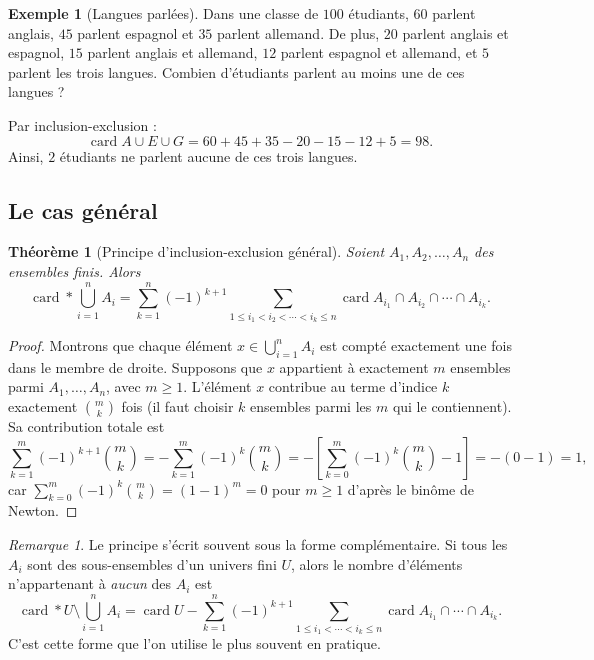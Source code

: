 \documentclass[12pt,a4paper,openany]{book}
\theoremstyle{definition}
\newtheorem{exemple}[definition]{Exemple}
\theoremstyle{plain}
\newtheorem{theoreme}[definition]{Théorème}
\theoremstyle{remark}
\newtheorem{remarque}[definition]{Remarque}
\DeclareMathOperator{\card}{card}
\begin{document}
\begin{exemple}[Langues parlées]
\label{ex:ie-langues}
Dans une classe de $100$ étudiants, $60$ parlent anglais, $45$ parlent espagnol
et $35$ parlent allemand. De plus, $20$ parlent anglais et espagnol, $15$ parlent
anglais et allemand, $12$ parlent espagnol et allemand, et $5$ parlent les trois langues.
Combien d'étudiants parlent au moins une de ces langues ?

Par inclusion-exclusion :
\[
  \card{A \cup E \cup G} = 60 + 45 + 35 - 20 - 15 - 12 + 5 = 98.
\]
Ainsi, $2$ étudiants ne parlent aucune de ces trois langues.
\end{exemple}

\subsection{Le cas général}

\begin{theoreme}[Principe d'inclusion-exclusion général]
\label{thm:ie-general}
Soient $A_1, A_2, \dots, A_n$ des ensembles finis. Alors
\[
  \card*{\bigcup_{i=1}^{n} A_i}
    = \sum_{k=1}^{n} (-1)^{k+1}
      \sum_{1 \leqslant i_1 < i_2 < \cdots < i_k \leqslant n}
      \card{A_{i_1} \cap A_{i_2} \cap \cdots \cap A_{i_k}}.
\]
\end{theoreme}

\begin{proof}
Montrons que chaque élément $x \in \bigcup_{i=1}^n A_i$ est compté exactement
une fois dans le membre de droite. Supposons que $x$ appartient à exactement
$m$ ensembles parmi $A_1, \dots, A_n$, avec $m \geqslant 1$.
L'élément $x$ contribue au terme d'indice $k$ exactement $\binom{m}{k}$ fois
(il faut choisir $k$ ensembles parmi les $m$ qui le contiennent). Sa contribution
totale est
\[
  \sum_{k=1}^{m} (-1)^{k+1} \binom{m}{k}
    = -\sum_{k=1}^{m} (-1)^{k} \binom{m}{k}
    = -\left[\sum_{k=0}^{m} (-1)^{k} \binom{m}{k} - 1\right]
    = -(0 - 1) = 1,
\]
car $\sum_{k=0}^{m} (-1)^k \binom{m}{k} = (1-1)^m = 0$ pour $m \geqslant 1$
d'après le binôme de Newton.
\end{proof}

\begin{remarque}
\label{rem:ie-complementaire}
Le principe s'écrit souvent sous la forme complémentaire. Si tous les $A_i$
sont des sous-ensembles d'un univers fini $U$, alors le nombre d'éléments
n'appartenant à \emph{aucun} des $A_i$ est
\[
  \card*{U \setminus \bigcup_{i=1}^{n} A_i}
    = \card{U} - \sum_{k=1}^{n} (-1)^{k+1}
      \sum_{1 \leqslant i_1 < \cdots < i_k \leqslant n}
      \card{A_{i_1} \cap \cdots \cap A_{i_k}}.
\]
C'est cette forme que l'on utilise le plus souvent en pratique.
\end{remarque}
\end{document}
